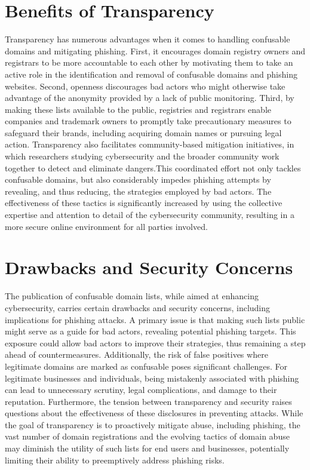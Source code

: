 \section{Benefits of Transparency }


Transparency has numerous advantages when it comes to handling confusable domains and mitigating phishing. First, it encourages domain registry owners and registrars to be more accountable to each other by motivating them to take an active role in the identification and removal of confusable domains and phishing websites. Second, openness discourages bad actors who might otherwise take advantage of the anonymity provided by a lack of public monitoring. Third, by making these lists available to the public, registries and registrars enable companies and trademark owners to promptly take precautionary measures to safeguard their brands, including acquiring domain names or pursuing legal action. Transparency also facilitates community-based mitigation initiatives, in which researchers studying cybersecurity and the broader community work together to detect and eliminate dangers.This coordinated effort not only tackles confusable domains, but also considerably impedes phishing attempts by revealing, and thus reducing, the strategies employed by bad actors. The effectiveness of these tactics is significantly increased by using the collective expertise and attention to detail of the cybersecurity community, resulting in a more secure online environment for all parties involved.


\section{Drawbacks and Security Concerns} 

The publication of confusable domain lists, while aimed at enhancing cybersecurity, carries certain drawbacks and security concerns, including implications for phishing attacks. A primary issue is that making such lists public might serve as a guide for bad actors, revealing potential phishing targets. This exposure could allow bad actors to improve their strategies, thus remaining a step ahead of countermeasures. Additionally, the risk of false positives where legitimate domains are marked as confusable poses significant challenges. For legitimate businesses and individuals, being mistakenly associated with phishing can lead to unnecessary scrutiny, legal complications, and damage to their reputation. Furthermore, the tension between transparency and security raises questions about the effectiveness of these disclosures in preventing attacks. While the goal of transparency is to proactively mitigate abuse, including phishing, the vast number of domain registrations and the evolving tactics of domain abuse may diminish the utility of such lists for end users and businesses, potentially limiting their ability to preemptively address phishing risks.



